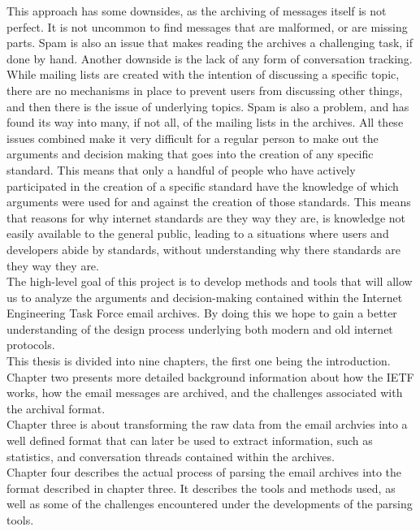 \documentclass[a4paper,english]{report}
\begin{document}
This approach has some downsides, as the archiving of messages itself is not perfect. It is not uncommon to find messages that are malformed, or are missing parts. Spam is also an issue that makes reading the archives a challenging task, if done by hand. Another downside is the lack of any form of conversation tracking. While 
mailing lists are created with the intention of discussing a specific topic, there are no mechanisms in place to prevent users from discussing other things, and then there is the issue of underlying topics. Spam is also a problem, and has found its way into many, if not all, of the mailing lists in the archives. 
All these issues combined make it very difficult for a regular person to make out the arguments and decision making that goes into the creation of any specific standard. This means that only a handful of people who have actively participated in the creation of a specific standard have the knowledge of which arguments were used for and against the creation of those standards. This means that reasons for why internet standards are they way they are, is knowledge not easily available to the general public, leading to a situations where users and developers abide by standards, without understanding why there standards are they way they are.\\

The high-level goal of this project is to develop methods and tools that will allow us to analyze the arguments and decision-making contained within the Internet Engineering Task Force email archives. By doing this we hope to gain a better understanding of the design process underlying both modern and old internet protocols.\\

This thesis is divided into nine chapters, the first one being the introduction. Chapter two presents more detailed background information about how the IETF works, how the email messages are archived, and the challenges associated with the archival format.\\

Chapter three is about transforming the raw data from the email archvies into a well defined format that can later be used to extract information, such as statistics, and conversation threads contained within the archives.\\

Chapter four describes the actual process of parsing the email archives into the format described in chapter three. It describes the tools and methods used, as well as some of the challenges encountered under the developments of the parsing tools.\\
\end{document}
